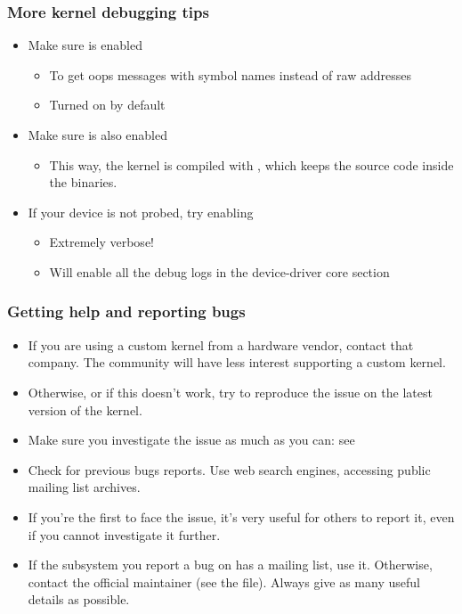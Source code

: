 \begin{frame}
  \frametitle{More kernel debugging tips}
  \begin{itemize}
  \item Make sure  is enabled
    \begin{itemize}
    \item To get oops messages with symbol names instead of raw
      addresses
    \item Turned on by default
    \end{itemize}
  \item Make sure  is also enabled
    \begin{itemize}
    \item This way, the kernel is compiled with , which keeps the source code inside the binaries.
    \end{itemize}
  \item If your device is not probed, try enabling
    \begin{itemize}
    \item Extremely verbose!
    \item Will enable all the debug logs in the device-driver core
      section
    \end{itemize}
  \end{itemize}
\end{frame}

\begin{frame}
  \frametitle{Getting help and reporting bugs}
  \begin{itemize}
  \item If you are using a custom kernel from a hardware vendor, contact
        that company. The community will have less interest supporting
        a custom kernel.
  \item Otherwise, or if this doesn't work, try to reproduce the
        issue on the latest version of the kernel.
  \item Make sure you investigate the issue as much as you can: see
  \item Check for previous bugs reports. Use web search engines,
    accessing public mailing list archives.
  \item If you're the first to face the issue, it's very useful for
    others to report it, even if you cannot investigate it further.
  \item If the subsystem you report a bug on has a mailing list, use
    it. Otherwise, contact the official maintainer (see the
     file). Always give as many useful details as
    possible.
  \end{itemize}
\end{frame}

